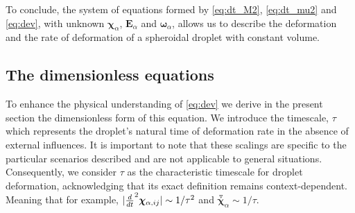To conclude, the system of equations formed by \ref{eq:dt_M2}, \ref{eq:dt_mu2} and \ref{eq:dev}, with unknown $\bm\chi_\alpha$, $\textbf{E}_\alpha$ and $\bm\omega_\alpha$, allows us to describe the deformation and the rate of deformation of a spheroidal droplet with constant volume.

\subsection{The dimensionless equations}


To enhance the physical understanding of \ref{eq:dev} we derive in the present section the dimensionless form of this equation. 
We introduce the timescale, $\tau$ which represents the droplet's natural time of deformation rate in the absence of external influences.
It is important to note that these scalings are specific to the particular scenarios described and are not applicable to general situations. 
Consequently, we consider $\tau$ as the characteristic timescale for droplet deformation, acknowledging that its exact definition remains context-dependent.
Meaning that for example, $|\frac{d}{dt}^2 \bm\chi_{\alpha,ij} |\sim 1/\tau^2$ and $ \overset{ \triangledown  }{\bm\chi}_\alpha \sim 1/\tau$. 


